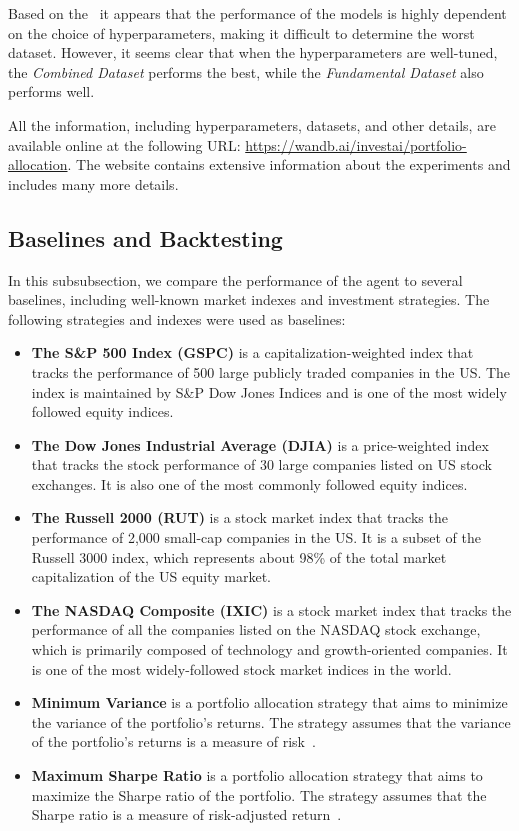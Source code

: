 \documentclass[../xlapes02]{subfiles}
\begin{document}
    Based on the~ it appears that the performance of the models is highly dependent on the choice of hyperparameters, making it difficult to determine the worst dataset. However, it seems clear that when the hyperparameters are well-tuned, the \emph{Combined Dataset} performs the best, while the \emph{Fundamental Dataset} also performs well.

    All the information, including hyperparameters, datasets, and other details, are available online at the following URL: \url{https://wandb.ai/investai/portfolio-allocation}. The website contains extensive information about the experiments and includes many more details.

    \subsection{Baselines and Backtesting}\label{subsec:baselines-and-backtesting}
    In this subsubsection, we compare the performance of the agent to several baselines, including well-known market indexes and investment strategies. The following strategies and indexes were used as baselines:

    \begin{itemize}
        \item \textbf{The S\&P 500 Index (GSPC)} is a capitalization-weighted index that tracks the performance of 500 large publicly traded companies in the US. The index is maintained by S\&P Dow Jones Indices and is one of the most widely followed equity indices.
        \item \textbf{The Dow Jones Industrial Average (DJIA)} is a price-weighted index that tracks the stock performance of 30 large companies listed on US stock exchanges. It is also one of the most commonly followed equity indices.
        \item \textbf{The Russell 2000 (RUT)} is a stock market index that tracks the performance of 2,000 small-cap companies in the US. It is a subset of the Russell 3000 index, which represents about 98\% of the total market capitalization of the US equity market.
        \item \textbf{The NASDAQ Composite (IXIC)} is a stock market index that tracks the performance of all the companies listed on the NASDAQ stock exchange, which is primarily composed of technology and growth-oriented companies. It is one of the most widely-followed stock market indices in the world.
        \item \textbf{Minimum Variance} is a portfolio allocation strategy that aims to minimize the variance of the portfolio's returns. The strategy assumes that the variance of the portfolio's returns is a measure of risk~\cite{investopedia}.
        \item \textbf{Maximum Sharpe Ratio} is a portfolio allocation strategy that aims to maximize the Sharpe ratio of the portfolio. The strategy assumes that the Sharpe ratio is a measure of risk-adjusted return~\cite{investopedia}.
    \end{itemize}
\end{document}
